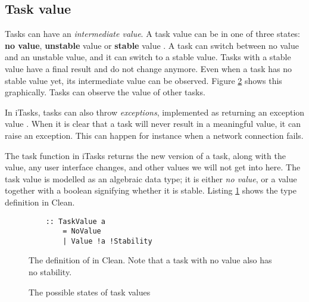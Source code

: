 \subsection{Task value}\label{section-top-task-value}
Tasks can have an \textit{intermediate value}. A task value can be in one of three states: \textbf{no value}, \textbf{unstable} value or \textbf{stable} value \cite[\S 4.3]{achten2013introduction}. A task can switch between no value and an unstable value, and it can switch to a stable value. Tasks with a stable value have a final result and do not change anymore. Even when a task has no stable value yet, its intermediate value can be observed. Figure \ref{fig:task_states} shows this graphically. Tasks can observe the value of other tasks.

In iTasks, tasks can also throw \textit{exceptions}, implemented as returning an exception value \cite[\S 3.1.1]{plasmeijer2012task}. When it is clear that a task will never result in a meaningful value, it can raise an exception. This can happen for instance when a network connection fails.

The task function in iTasks returns the new version of a task, along with the value, any user interface changes, and other values we will not get into here. The task value is modelled as an algebraic data type; it is either \textit{no value}, or a value together with a boolean signifying whether it is stable. Listing \ref{lst:clean_task_value} shows the type definition in Clean.

\begin{figure}[ht]
    \centering
    \begin{verbatim}
    :: TaskValue a
        = NoValue
        | Value !a !Stability
    \end{verbatim}
    \caption{The definition of  in Clean. Note that a task with no value also has no stability.}
    \label{lst:clean_task_value}
\end{figure}

\begin{figure}
    \centering
    \caption{The possible states of task values}
    \label{fig:task_states}
\end{figure}

